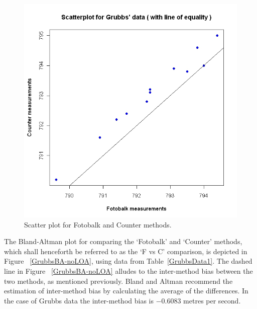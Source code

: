 \documentclass[12pt, a4paper]{report}
\theoremstyle{plain}
\theoremstyle{definition}
\theoremstyle{remark}
\begin{document}
	\begin{figure}[h!]
		\begin{center}
			\includegraphics[width=125mm]{images/GrubbsScatter.jpeg}
			\caption{Scatter plot for Fotobalk and Counter methods.}\label{GrubbsScatter}
		\end{center}
	\end{figure}
	
	
	
	The Bland-Altman plot for comparing the `Fotobalk' and `Counter' methods, which shall henceforth be referred to as the `F vs C' comparison, is depicted in Figure ~\ref{GrubbsBA-noLOA}, using data from Table~\ref{GrubbsData1}. The dashed line in Figure ~\ref{GrubbsBA-noLOA} alludes to the inter-method bias between the two methods, as mentioned previously. Bland and Altman recommend the estimation of inter-method bias by calculating the	average of the differences. In the case of Grubbs data the inter-method bias is $-0.6083$ metres per second.
	
\end{document}
